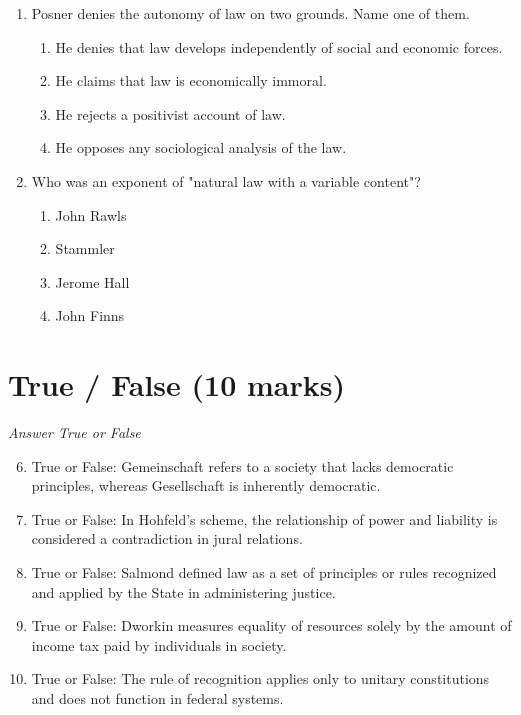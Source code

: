 \documentclass[12pt]{article}
\begin{document}
\begin{enumerate}[label=\arabic*.]
\item Posner denies the autonomy of law on two grounds. Name one of them.
\begin{enumerate}[label=(\alph*)]
    \item He denies that law develops independently of social and economic forces.
    \item He claims that law is economically immoral.
    \item He rejects a positivist account of law.
    \item He opposes any sociological analysis of the law.
\end{enumerate}
\item Who was an exponent of "natural law with a variable content"?
\begin{enumerate}[label=(\alph*)]
    \item John Rawls
    \item Stammler
    \item Jerome Hall
    \item John Finns
\end{enumerate}
\end{enumerate}

\section*{True / False (10 marks)}
\textit{Answer True or False}
\begin{enumerate}[label=\arabic*.]
\setcounter{enumi}{5}
\item True or False: Gemeinschaft refers to a society that lacks democratic principles, whereas Gesellschaft is inherently democratic.
\item True or False: In Hohfeld's scheme, the relationship of power and liability is considered a contradiction in jural relations.
\item True or False: Salmond defined law as a set of principles or rules recognized and applied by the State in administering justice.
\item True or False: Dworkin measures equality of resources solely by the amount of income tax paid by individuals in society.
\item True or False: The rule of recognition applies only to unitary constitutions and does not function in federal systems.
\end{enumerate}
\end{document}
